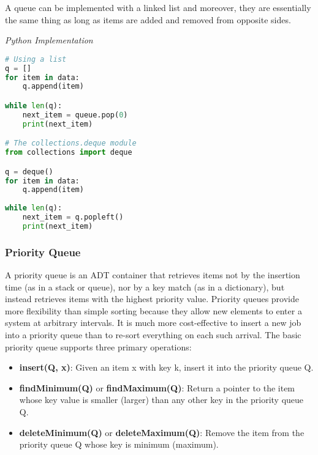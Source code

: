 \documentclass{article}
\begin{document}
    A queue can be implemented with a linked list and moreover, they are essentially the same thing as long as items are added and removed from opposite sides.
    
\vspace{8pt} \emph{Python Implementation}
\begin{lstlisting}[language=Python]
# Using a list 
q = []
for item in data:
    q.append(item) 

while len(q):
    next_item = queue.pop(0)
    print(next_item)

# The collections.deque module 
from collections import deque 

q = deque() 
for item in data:
    q.append(item) 
 
while len(q):
    next_item = q.popleft() 
    print(next_item)

\end{lstlisting}
    
    \subsubsection{Priority Queue}
    A priority queue is an ADT container that retrieves items not by the insertion time (as in a stack or queue), nor by a key match (as in a dictionary), but instead retrieves items with the highest priority value. Priority queues provide more flexibility than simple sorting because they allow new elements to enter a system at arbitrary intervals. It is much more cost-effective to insert a new job into a priority queue than to re-sort everything on each such arrival. The basic priority queue supports three primary operations:
    \begin{itemize}
        \item \textbf{insert(Q, x)}: Given an item x with key k, insert it into the priority queue Q.
        \item \textbf{findMinimum(Q)} or \textbf{findMaximum(Q)}: Return a pointer to the item whose key value is smaller (larger) than any other key in the priority queue Q.
        \item \textbf{deleteMinimum(Q)} or \textbf{deleteMaximum(Q)}: Remove the item from the priority queue Q whose key is minimum (maximum).
    \end{itemize}
\end{document}
